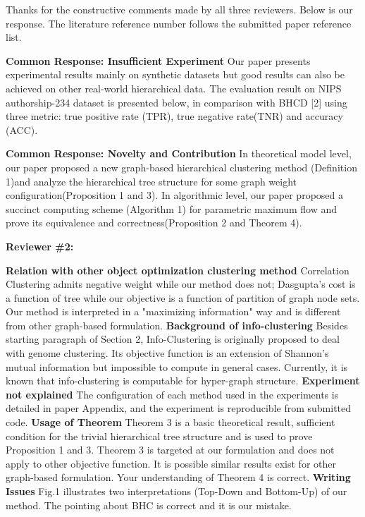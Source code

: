 \documentclass{article}
\begin{document}
Thanks for the constructive comments made by all three reviewers.
Below is our response. The literature reference number follows the submitted paper reference list. 

\textbf{Common Response: Insufficient Experiment}
Our paper presents experimental results mainly on synthetic datasets but good results can also be achieved on other real-world hierarchical data. The evaluation result on NIPS authorship-234 dataset is presented below, in comparison with BHCD [2] using three metric: true positive rate (TPR), true negative rate(TNR) and accuracy (ACC). 

\textbf{Common Response: Novelty and Contribution}
In theoretical model level, our paper proposed a new graph-based hierarchical clustering method (Definition 1)and analyze the hierarchical tree structure for some graph weight configuration(Proposition 1 and 3). In algorithmic level, our paper proposed a  succinct computing scheme (Algorithm 1) for parametric maximum flow and prove its equivalence and correctness(Proposition 2 and Theorem 4).

\textbf{Reviewer \#2:}

\textbf{Relation with other object optimization clustering method}
Correlation Clustering admits negative weight while our method does not; Dasgupta's cost is a function of tree while our objective is a function of partition of graph node sets. Our method is interpreted in a "maximizing information" way and is different from other graph-based formulation.
\textbf{Background of info-clustering} Besides starting paragraph of Section 2, Info-Clustering is originally proposed to deal with genome clustering. Its objective function is an extension of Shannon's mutual information but impossible to compute in general cases. Currently, it is known that info-clustering is computable for hyper-graph structure.
\textbf{Experiment not explained} The configuration of each method used in the experiments is detailed in paper Appendix, and the experiment is reproducible from submitted code.
\textbf{Usage of Theorem} Theorem 3 is a basic theoretical result, sufficient condition for the trivial hierarchical tree structure and is used to prove Proposition 1 and 3. Theorem 3 is targeted at our formulation and does not apply to other objective function. It is possible similar results exist for other graph-based formulation. Your understanding of Theorem 4 is correct.
\textbf{Writing Issues} Fig.1 illustrates two interpretations (Top-Down and Bottom-Up) of our method. The pointing about BHC is correct and it is our mistake.
\end{document}

